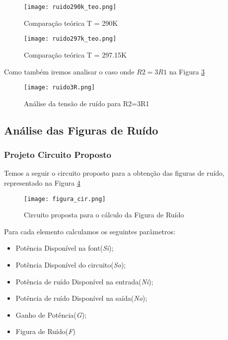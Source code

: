 \documentclass[a4paper,12pt]{proc}
\begin{document}
\begin{figure}[htbp]
    \centering
    \texttt{[image: ruido290k\_teo.png]}
    \caption{Comparação teórica T = 290K}
    \label{ruido290teo}
\end{figure}

\begin{figure}[htbp]
    \centering
    \texttt{[image: ruido297k\_teo.png]}
    \caption{Comparação teórica T = 297.15K}
    \label{ruido297teo}
\end{figure}

\noindent Como também iremos analisar o caso onde $R2=3R1$ na Figura \ref{3rteo}

\begin{figure}[htbp]
    \centering
    \texttt{[image: ruido3R.png]}
    \caption{Análise da tensão de ruído para R2=3R1}
    \label{3rteo}
\end{figure}

\subsection{Análise das Figuras de Ruído}

\subsubsection{Projeto Circuito Proposto}
Temos a seguir o circuito proposto para a obtenção das figuras de ruído, representado na Figura \ref{cir_figura}

\begin{figure}[htbp]
    \centering
    \texttt{[image: figura\_cir.png]}
    \caption{Circuito proposta para o cálculo da Figura de Ruído}
    \label{cir_figura}
\end{figure}

\noindent Para cada elemento calculamos os seguintes parâmetros:

\begin{itemize}
    \item Potência Disponível na font(\textit{Si});
    \item Potência Disponível do circuito(\textit{So});
    \item Potência de ruído Disponível na entrada(\textit{Ni});
    \item Potência de ruído Disponível na saída(\textit{No});
    \item Ganho de Potência(\textit{G});
    \item Figura de Ruído(\textit{F})
\end{itemize}
\end{document}
